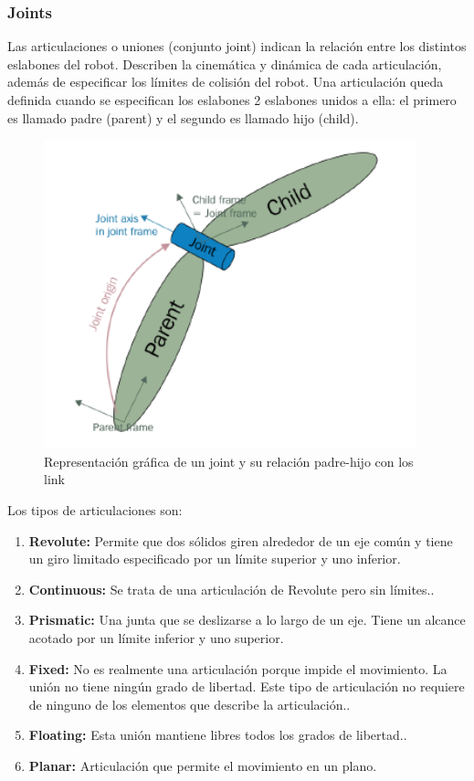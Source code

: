                                 \newpage

        
        \subsubsection{Joints}
        
        Las articulaciones o uniones (conjunto joint) indican la relación entre los distintos eslabones del robot. Describen la cinemática y dinámica de cada articulación, además de especificar los límites de colisión del robot. Una articulación queda definida cuando se especifican los eslabones 2 eslabones unidos a ella: el primero es llamado padre (parent) y el segundo es llamado  hijo (child).
        
        \begin{figure}[htb]
            \centering
            \includegraphics[width=0.65\linewidth]{Main/Chapter3/Images3/3-8/representacion-de-una-articulacion-en-URDF.png}
            \caption{Representación gráfica de un joint y su relación padre-hijo con los link \cite{urdftutorials}}
            \label{f:Cap3-8_nose_nose}
        \end{figure} 
        
        Los tipos de articulaciones son:
        
        \begin{enumerate}
           \item \textbf{Revolute:} Permite que dos sólidos giren alrededor de un eje común y tiene un giro limitado especificado por un límite superior y uno inferior.
            \item \textbf{Continuous:} Se trata de una articulación de Revolute pero sin límites..
            \item \textbf{Prismatic:} Una junta que se deslizarse a lo largo de un eje. Tiene un alcance acotado por un límite inferior y uno superior.
            \item \textbf{Fixed:} No es realmente una articulación porque impide el movimiento. La unión no tiene ningún grado de libertad. Este tipo de articulación no requiere de ninguno de los elementos que describe la articulación..
            \item \textbf{Floating:} Esta unión mantiene libres todos los grados de libertad..
            \item \textbf{Planar:} Articulación que permite el movimiento en un plano.
        \end{enumerate}
        
